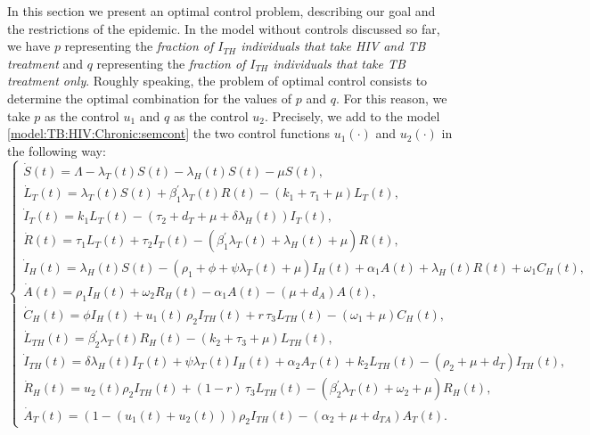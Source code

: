 \documentclass{my_aims}
\theoremstyle{definition}
\begin{document}
In this section we present an optimal control problem, describing our goal
and the restrictions of the epidemic. In the model without controls discussed so far,
we have $p$ representing the \emph{fraction of $I_{TH}$ individuals that take HIV and TB treatment}
and $q$ representing the \emph{fraction of $I_{TH}$ individuals that take TB treatment only}.
Roughly speaking, the problem of optimal control consists
to determine the optimal combination for the values of $p$ and $q$. For this reason,
we take $p$ as the control $u_1$ and $q$ as the control $u_2$. Precisely, we add to the model
\eqref{model:TB:HIV:Chronic:semcont} the two control functions
$u_1(\cdot)$ and $u_2(\cdot)$ in the following way:
\begin{equation}
\label{model:TB:HIV:Chronic:comcontrolos}
\begin{cases}
\dot{S}(t) = \Lambda - \lambda_T(t) S(t) - \lambda_H(t) S(t) - \mu S(t),\\[0.2 cm]
\dot{L}_T(t) = \lambda_T(t) S(t) + \beta^{'}_1 \lambda_T(t) R(t)
- \left(k_1 + \tau_1 + \mu\right) L_T(t),\\[0.2 cm]
\dot{I}_T(t) = k_1 L_T(t) - \left(\tau_2 +d_T +\mu + \delta \lambda_H(t)\right)I_T(t), \\[0.2 cm]
\dot{R}(t) = \tau_1 L_T(t) + \tau_2 I_T(t) - (\beta^{'}_1 \lambda_T(t)
+ \lambda_H(t) + \mu) R(t),\\[0.2 cm]
\dot{I}_H(t) = \lambda_H(t) S(t) - (\rho_1  + \phi + \psi \lambda_T(t) + \mu)I_H(t)
+ \alpha_1 A(t) + \lambda_H(t) R(t) + \omega_1 C_H(t), \\[0.2 cm]
\dot{A}(t) =  \rho_1 I_H(t) + \omega_2 R_H(t)
- \alpha_1 A(t) - (\mu + d_A) A(t),\\[0.2 cm]
\dot{C}_H(t) = \phi I_H(t) + u_1(t) \, \rho_2 I_{TH}(t)
+ r\,  \tau_3 L_{TH}(t) - (\omega_1 + \mu)C_H(t),\\[0.2 cm]
\dot{L}_{TH}(t) = \beta^{'}_2 \lambda_T(t) R_{H}(t)
- \left(k_2 + \tau_3 + \mu\right) L_{TH}(t),\\[0.2 cm]
\dot{I}_{TH}(t) = \delta \lambda_H(t) I_T(t) + \psi \lambda_T(t) I_H(t)
+ \alpha_2 A_T(t)+ k_2 L_{TH}(t)
- \left( \rho_2 + \mu + d_T \right)I_{TH}(t),\\[0.2 cm]
\dot{R}_{H}(t) = u_2(t) \rho_2 I_{TH}(t) + (1-r)\, \tau_3 L_{TH}(t)
- \left(\beta^{'}_2 \lambda_T(t) + \omega_2 + \mu\right)R_{H}(t), \\[0.2 cm]
\dot{A}_T(t) = \left(1-(u_1(t)+u_2(t))\right)\rho_2 I_{TH}(t)
-\left(\alpha_2 + \mu + d_{TA}\right)A_T(t).
\end{cases}
\end{equation}
\end{document}
